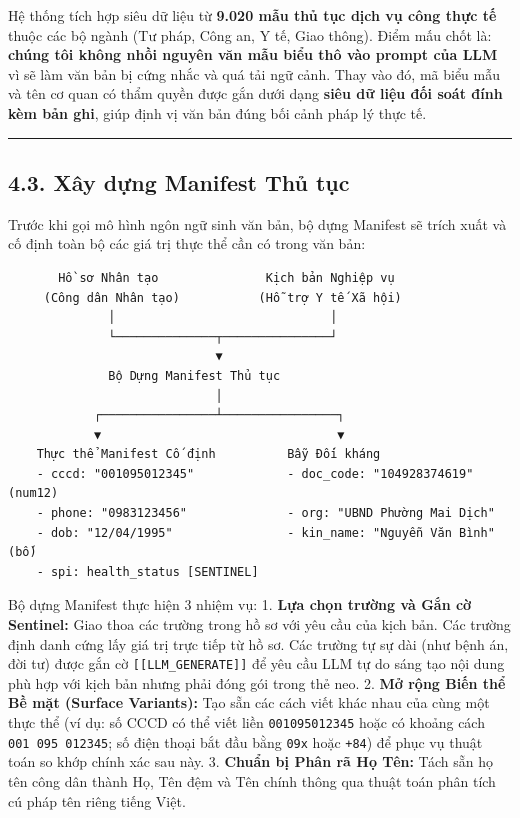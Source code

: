 \documentclass[
  11pt,
  a4paper,
]{article}
\begin{document}
Hệ thống tích hợp siêu dữ liệu từ \textbf{9.020 mẫu thủ tục dịch vụ công thực tế} thuộc các bộ ngành
(Tư pháp, Công an, Y tế, Giao thông). Điểm mấu chốt là: \textbf{chúng tôi không nhồi nguyên văn mẫu
biểu thô vào prompt của LLM} vì sẽ làm văn bản bị cứng nhắc và quá tải ngữ cảnh. Thay vào đó, mã
biểu mẫu và tên cơ quan có thẩm quyền được gắn dưới dạng \textbf{siêu dữ liệu đối soát đính kèm bản
ghi}, giúp định vị văn bản đúng bối cảnh pháp lý thực tế.

\begin{center}\rule{0.5\linewidth}{0.5pt}\end{center}

\subsection{4.3. Xây dựng Manifest Thủ tục}\label{xuxe2y-dux1ef1ng-manifest-thux1ee7-tux1ee5c}

Trước khi gọi mô hình ngôn ngữ sinh văn bản, bộ dựng Manifest sẽ trích xuất và cố định toàn bộ các
giá trị thực thể cần có trong văn bản:

\begin{verbatim}
       Hồ sơ Nhân tạo               Kịch bản Nghiệp vụ
     (Công dân Nhân tạo)           (Hỗ trợ Y tế Xã hội)
              │                              │
              └──────────────┬───────────────┘
                             ▼
              Bộ Dựng Manifest Thủ tục
                             │
            ┌────────────────┴────────────────┐
            ▼                                 ▼
    Thực thể Manifest Cố định          Bẫy Đối kháng
    - cccd: "001095012345"             - doc_code: "104928374619" (num12)
    - phone: "0983123456"              - org: "UBND Phường Mai Dịch"
    - dob: "12/04/1995"                - kin_name: "Nguyễn Văn Bình" (bố)
    - spi: health_status [SENTINEL]
\end{verbatim}

Bộ dựng Manifest thực hiện 3 nhiệm vụ: 1. \textbf{Lựa chọn trường và Gắn cờ Sentinel:} Giao thoa các
trường trong hồ sơ với yêu cầu của kịch bản. Các trường định danh cứng lấy giá trị trực tiếp từ hồ
sơ. Các trường tự sự dài (như bệnh án, đời tư) được gắn cờ \texttt{{[}{[}LLM\_GENERATE{]}{]}} để yêu
cầu LLM tự do sáng tạo nội dung phù hợp với kịch bản nhưng phải đóng gói trong thẻ neo. 2.
\textbf{Mở rộng Biến thể Bề mặt (Surface Variants):} Tạo sẵn các cách viết khác nhau của cùng một
thực thể (ví dụ: số CCCD có thể viết liền \texttt{001095012345} hoặc có khoảng cách
\texttt{001\ 095\ 012345}; số điện thoại bắt đầu bằng \texttt{09x} hoặc \texttt{+84}) để phục vụ
thuật toán so khớp chính xác sau này. 3. \textbf{Chuẩn bị Phân rã Họ Tên:} Tách sẵn họ tên công dân
thành Họ, Tên đệm và Tên chính thông qua thuật toán phân tích cú pháp tên riêng tiếng Việt.
\end{document}
